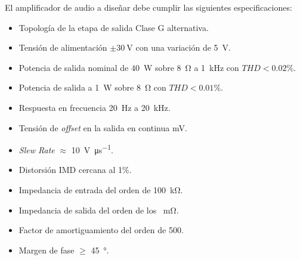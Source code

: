 El amplificador de audio a diseñar debe cumplir las siguientes especificaciones:

\begin{itemize}
	\item Topología de la etapa de salida Clase G alternativa.
	\item Tensión de alimentación $\pm \SI{30}{\volt}$ con una variación de \SI{5}{\volt}.
	\item Potencia de salida nominal de \SI{40}{\watt} sobre \SI{8}{\ohm} a \SI{1}{\kilo\hertz} con $THD<\num{0.02}\%$.
	\item Potencia de salida a \SI{1}{\watt} sobre \SI{8}{\ohm} con $THD<\num{0.01}\%$. 
	\item Respuesta en frecuencia \SI{20}{\hertz} a \SI{20}{\kilo\hertz}.
	\item Tensión de \textit{offset} en la salida en continua \si{\milli\volt}.
	\item \textit{Slew Rate} $\approx$ \SI{10}{\volt\per\micro\second}.
	\item Distorsión IMD cercana al 1\%.
	\item Impedancia de entrada del orden de \SI{100}{\kilo\ohm}.
	\item Impedancia de salida del orden de los \SI{}{\milli\ohm}.
	\item Factor de amortiguamiento del orden de 500.
	\item Margen de fase $\geq$ \SI{45}{\degree}.
\end{itemize}


